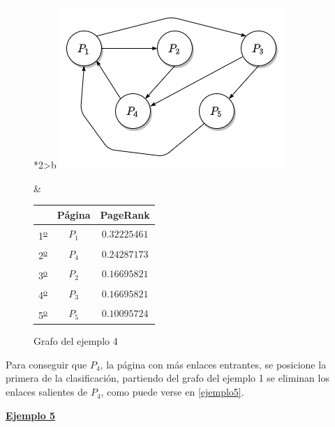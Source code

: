 \documentclass[size=a4, parskip=half, titlepage=false, toc=flat, toc=bib, 12pt, twoside]{scrartcl}
\theoremstyle{theorem-style}
\theoremstyle{definition-style}
\theoremstyle{remark-style}
\theoremstyle{example-style}
\theoremstyle{definition-style}
\theoremstyle{remark-style}
\begin{document}
\begin{figure}[!ht]
  \begin{tabular}{*{2}{>{\centering\arraybackslash}b{}}}
  \centering
    \includegraphics[scale=0.5]{./img/grafoej4}
    \caption{Grafo del ejemplo 4}
    &
      \renewcommand{\arraystretch}{1.3}
      \begin{tabular}{ccc}
        & Página & PageRank     \\ \hline
      1\textsuperscript{\underline{o}}} & $P_1$  & $0.32225461$ \\ \hline
      2\textsuperscript{\underline{o}}} & $P_4$  & $0.24287173$ \\ \hline
      3\textsuperscript{\underline{o}}} & $P_2$  & $0.16695821$ \\ \hline
      4\textsuperscript{\underline{o}}} & $P_3$  & $0.16695821$ \\ \hline
      5\textsuperscript{\underline{o}}} & $P_5$  & $0.10095724$ \\ \hline
      \end{tabular}
    \end{tabular}
\end{figure}

\newpage

Para conseguir que $P_4$, la página con más enlaces entrantes, se posicione la primera de la clasificación, partiendo del grafo del ejemplo 1 se eliminan los enlaces salientes de $P_4$, como puede verse en \ref{ejemplo5}.

\underline{\textbf{Ejemplo 5}}
\end{document}
